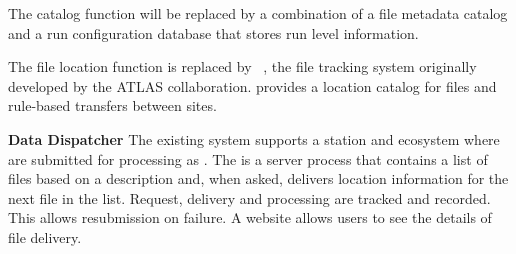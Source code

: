 \documentclass[../main-v1.tex]{subfiles}
\begin{document}
\begin{description}
\item{\bf {}}  The catalog function will be replaced by a combination of a file metadata catalog  and a run configuration database that stores run level information.
\item{\bf {}}  The file location function is replaced by ~\cite{Barisits:2019fyl}, the file tracking system originally developed by the ATLAS collaboration.  provides a location catalog for files and rule-based transfers between sites. 
\item{\bf Data Dispatcher} The existing  system supports a station and  ecosystem where  are submitted for processing as .  The  is a server process that contains a list of files based on a  description  and, when asked, delivers location information for the next file in the list.  Request, delivery and processing are tracked and recorded. This allows resubmission on failure. A website allows users to see the details of file delivery. 


\end{description}





\end{document}
